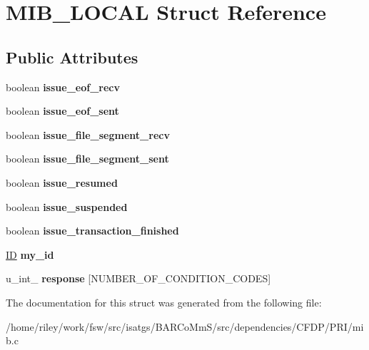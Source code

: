 \hypertarget{struct_m_i_b___l_o_c_a_l}{}\section{M\+I\+B\+\_\+\+L\+O\+C\+AL Struct Reference}
\label{struct_m_i_b___l_o_c_a_l}
\subsection*{Public Attributes}
\begin{DoxyCompactItemize}
\item 
boolean {\bfseries issue\+\_\+eof\+\_\+recv}\hypertarget{struct_m_i_b___l_o_c_a_l_a772be7fb8b1c5840d6b22dc59e948806}{}\label{struct_m_i_b___l_o_c_a_l_a772be7fb8b1c5840d6b22dc59e948806}

\item 
boolean {\bfseries issue\+\_\+eof\+\_\+sent}\hypertarget{struct_m_i_b___l_o_c_a_l_a3d9596a8697dee9e15c8d006e929cf11}{}\label{struct_m_i_b___l_o_c_a_l_a3d9596a8697dee9e15c8d006e929cf11}

\item 
boolean {\bfseries issue\+\_\+file\+\_\+segment\+\_\+recv}\hypertarget{struct_m_i_b___l_o_c_a_l_a546d00e23de68e7bbfc8dddd934bed25}{}\label{struct_m_i_b___l_o_c_a_l_a546d00e23de68e7bbfc8dddd934bed25}

\item 
boolean {\bfseries issue\+\_\+file\+\_\+segment\+\_\+sent}\hypertarget{struct_m_i_b___l_o_c_a_l_a86ddf6121969386d1bc4eac6ee8bd49c}{}\label{struct_m_i_b___l_o_c_a_l_a86ddf6121969386d1bc4eac6ee8bd49c}

\item 
boolean {\bfseries issue\+\_\+resumed}\hypertarget{struct_m_i_b___l_o_c_a_l_a574f5afa306f24ee4b018a597837a8c0}{}\label{struct_m_i_b___l_o_c_a_l_a574f5afa306f24ee4b018a597837a8c0}

\item 
boolean {\bfseries issue\+\_\+suspended}\hypertarget{struct_m_i_b___l_o_c_a_l_abbc94e7d82c735a48a614eb5ee673a88}{}\label{struct_m_i_b___l_o_c_a_l_abbc94e7d82c735a48a614eb5ee673a88}

\item 
boolean {\bfseries issue\+\_\+transaction\+\_\+finished}\hypertarget{struct_m_i_b___l_o_c_a_l_a4011dd5b6a49f6d472dd91c51d8f8668}{}\label{struct_m_i_b___l_o_c_a_l_a4011dd5b6a49f6d472dd91c51d8f8668}

\item 
\hyperlink{struct_i_d}{ID} {\bfseries my\+\_\+id}\hypertarget{struct_m_i_b___l_o_c_a_l_a42577e4d333d9c521f21fe923adc789c}{}\label{struct_m_i_b___l_o_c_a_l_a42577e4d333d9c521f21fe923adc789c}

\item 
u\+\_\+int\+\_ {\bfseries response} \mbox{[}N\+U\+M\+B\+E\+R\+\_\+\+O\+F\+\_\+\+C\+O\+N\+D\+I\+T\+I\+O\+N\+\_\+\+C\+O\+D\+ES\mbox{]}\hypertarget{struct_m_i_b___l_o_c_a_l_a5825a2886e9cf25547b07e49bbccc98b}{}\label{struct_m_i_b___l_o_c_a_l_a5825a2886e9cf25547b07e49bbccc98b}

\end{DoxyCompactItemize}


The documentation for this struct was generated from the following file\+:\begin{DoxyCompactItemize}
\item 
/home/riley/work/fsw/src/isatgs/\+B\+A\+R\+Co\+Mm\+S/src/dependencies/\+C\+F\+D\+P/\+P\+R\+I/mib.\+c\end{DoxyCompactItemize}
